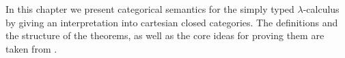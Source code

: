 
In this chapter we present categorical semantics for the simply typed
$λ$-calculus by giving an interpretation into cartesian closed categories.
The definitions and the structure of the theorems, as well as the core
ideas for proving them are taken from \citet{PittsNotes}.
